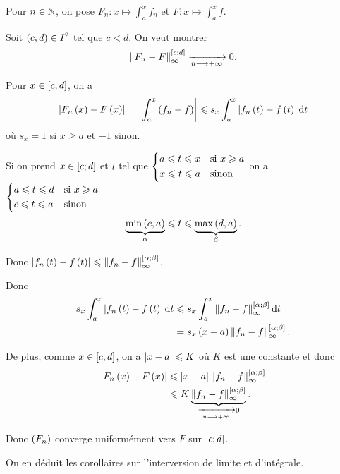 \begin{dem}
Pour \(n\in\N\), on pose \(F_n:x\mapsto\int_a^xf_n\) et \(F:x\mapsto\int_a^xf\).

Soit \(\paren{c,d}\in I^2\) tel que \(c<d\). On veut montrer \[\norme{F_n-F}_\infty^{\intervii{c}{d}}\tendqd{n\to\pinf}0.\]

Pour \(x\in\intervii{c}{d}\), on a \[\abs{F_n\paren{x}-F\paren{x}}=\abs{\int_a^x\paren{f_n-f}}\leq s_x\int_a^x\abs{f_n\paren{t}-f\paren{t}}\odif{t}\] où \(s_x=1\) si \(x\geq a\) et \(-1\) sinon.

Si on prend \(x\in\intervii{c}{d}\) et \(t\) tel que \(\begin{dcases}
a\leq t\leq x &\text{si }x\geq a \\
x\leq t\leq a &\text{sinon}
\end{dcases}\) on a \(\begin{dcases}
a\leq t\leq d &\text{si }x\geq a \\
c\leq t\leq a &\text{sinon}
\end{dcases}\) \ie \[\underbrace{\min\paren{c,a}}_{\alpha}\leq t\leq\underbrace{\max\paren{d,a}}_{\beta}.\]

Donc \(\abs{f_n\paren{t}-f\paren{t}}\leq\norme{f_n-f}_\infty^{\intervii{\alpha}{\beta}}\).

Donc \[\begin{aligned}
s_x\int_a^x\abs{f_n\paren{t}-f\paren{t}}\odif{t}&\leq s_x\int_a^x\norme{f_n-f}_\infty^{\intervii{\alpha}{\beta}}\odif{t} \\
&=s_x\paren{x-a}\norme{f_n-f}_\infty^{\intervii{\alpha}{\beta}}.
\end{aligned}\]

De plus, comme \(x\in\intervii{c}{d}\), on a \(\abs{x-a}\leq K\) où \(K\) est une constante et donc \[\begin{aligned}
\abs{F_n\paren{x}-F\paren{x}}&\leq\abs{x-a}\norme{f_n-f}_\infty^{\intervii{\alpha}{\beta}} \\
&\leq K\underbrace{\norme{f_n-f}_\infty^{\intervii{\alpha}{\beta}}}_{\tendqd{n\to\pinf}0}.
\end{aligned}\]

Donc \(\paren{F_n}\) converge uniformément vers \(F\) sur \(\intervii{c}{d}\).
\end{dem}

On en déduit les corollaires sur l'interversion de limite et d'intégrale.

